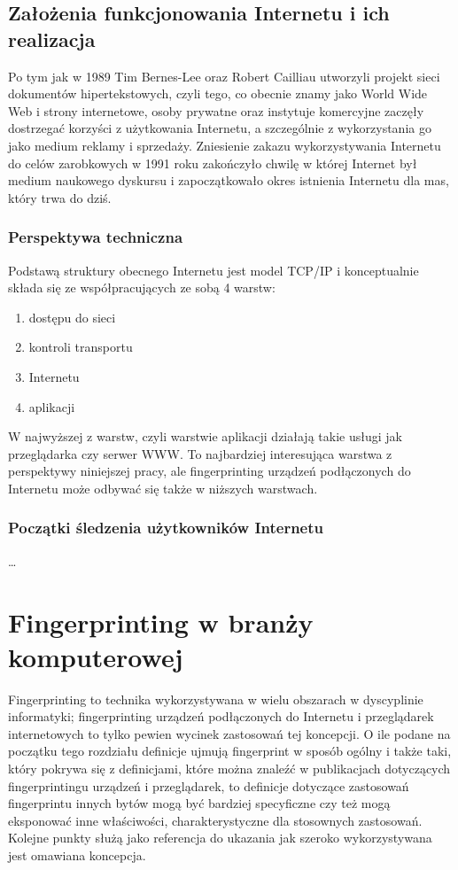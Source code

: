 \subsection{Założenia funkcjonowania Internetu i ich realizacja}
Po tym jak w 1989 Tim Bernes-Lee oraz Robert Cailliau utworzyli projekt sieci
dokumentów hipertekstowych, czyli tego, co obecnie znamy jako World Wide Web i
strony internetowe, osoby prywatne oraz instytuje komercyjne zaczęły dostrzegać
korzyści z użytkowania Internetu, a szczególnie z wykorzystania go jako medium
reklamy i sprzedaży. Zniesienie zakazu wykorzystywania Internetu do celów
zarobkowych w 1991 roku zakończyło chwilę w której Internet był medium naukowego
dyskursu i zapoczątkowało okres istnienia Internetu dla mas, który trwa do dziś.

\subsubsection{Perspektywa techniczna}
Podstawą struktury obecnego Internetu jest model TCP/IP i konceptualnie składa
się ze współpracujących ze sobą 4 warstw:
\begin{enumerate}
	\item dostępu do sieci
	\item kontroli transportu
	\item Internetu
	\item aplikacji
\end{enumerate}
W najwyższej z warstw, czyli warstwie aplikacji działają takie usługi jak
przeglądarka czy serwer WWW. To najbardziej interesująca warstwa z perspektywy
niniejszej pracy, ale fingerprinting urządzeń podłączonych do Internetu może
odbywać się także w niższych warstwach. %

\subsubsection{Początki śledzenia użytkowników Internetu}
\dots

\section{Fingerprinting w branży komputerowej}
Fingerprinting to technika wykorzystywana w wielu obszarach w dyscyplinie
informatyki; fingerprinting urządzeń podłączonych do Internetu i przeglądarek
internetowych to tylko pewien wycinek zastosowań tej koncepcji. O ile podane na
początku tego rozdziału definicje ujmują fingerprint w sposób ogólny i także
taki, który pokrywa się z definicjami, które można znaleźć w publikacjach
dotyczących fingerprintingu urządzeń i przeglądarek, to definicje dotyczące
zastosowań fingerprintu innych bytów mogą być bardziej specyficzne czy też mogą
eksponować inne właściwości, charakterystyczne dla stosownych zastosowań.
Kolejne punkty służą jako referencja do ukazania jak szeroko wykorzystywana jest
omawiana koncepcja.


